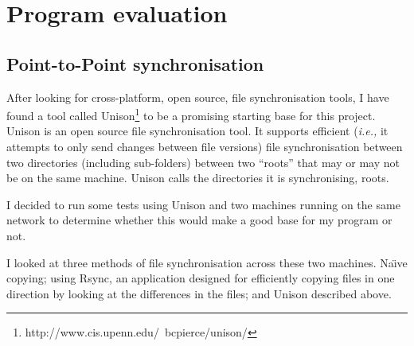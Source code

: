 \documentclass[12pt]{article}
\begin{document}
\section{Program evaluation}
\subsection{Point-to-Point synchronisation}
After looking for cross-platform, open source, file synchronisation
tools, I have found a tool called
Unison\footnote{http://www.cis.upenn.edu/~bcpierce/unison/}
to be a promising starting
base for this project. Unison is an open source file synchronisation tool.
It supports efficient (\emph{i.e.,} it attempts to only send changes between file versions) file synchronisation between two
directories (including sub-folders) between two ``roots''
that may or may not be on the same machine. Unison calls the
directories it is synchronising, roots.

I decided to run some tests using Unison 
and two machines running on the same network to 
determine whether this would make a good base for
my program or not.

I looked at three methods of file synchronisation across
these two machines. Na\"{\i}ve copying; using Rsync, an application
designed for efficiently copying files in one direction by looking at
the differences in the files; and Unison described above.

\end{document}
